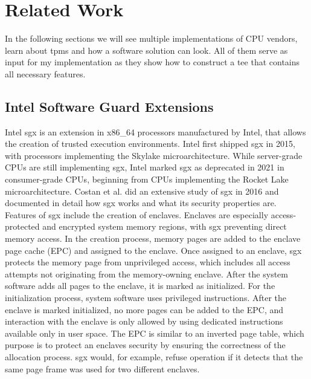\chapter{Related Work}
\label{chap:related}

In the following sections we will see multiple implementations of CPU vendors,
learn about \glspl{tpm} and how a software solution can look. All of them serve
as input for my implementation as they show how to construct a \gls{tee} that
contains all necessary features.

\section{Intel Software Guard Extensions}
\label{sec:20:sgx}
Intel \gls{sgx} is an extension in x86\_64 processors manufactured by Intel,
that allows the creation of trusted execution environments. Intel first shipped
\gls{sgx} in 2015, with processors implementing the Skylake microarchitecture.
While server-grade CPUs are still implementing \gls{sgx}, Intel marked \gls{sgx}
as deprecated in 2021 in consumer-grade CPUs, beginning from CPUs implementing
the Rocket Lake microarchitecture. Costan et al. did an extensive study of
\gls{sgx} in 2016 and documented in detail how \gls{sgx} works and what its
security properties are.\cite{costan2016intel} \\

Features of \gls{sgx} include the creation of enclaves. Enclaves are especially
access-protected and encrypted system memory regions, with \gls{sgx} preventing
direct memory access. In the creation process, memory pages are added to the
enclave page cache (EPC) and assigned to the enclave. Once assigned to an
enclave, \gls{sgx} protects the memory page from unprivileged access, which
includes all access attempts not originating from the memory-owning enclave.
After the system software adds all pages to the enclave, it is marked as
initialized. For the initialization process, system software uses privileged
instructions. After the enclave is marked initialized, no more pages can be
added to the EPC, and interaction with the enclave is only allowed by using
dedicated instructions available only in user space. The EPC is similar to an
inverted page table, which purpose is to protect an enclaves security by
ensuring the correctness of the allocation process. \gls{sgx} would, for
example, refuse operation if it detects that the same page frame was used for
two different enclaves.\\

